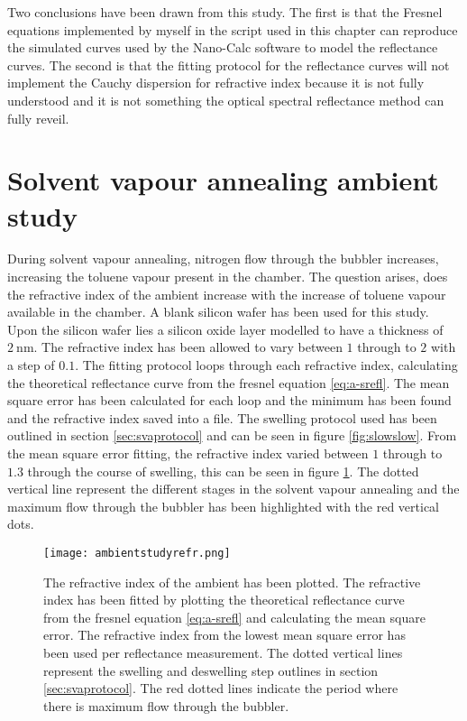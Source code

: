 \documentclass[MasterThesisMain.tex]{subfiles}
\begin{document}
Two conclusions have been drawn from this study. The first is that the Fresnel equations implemented by myself in the script used in this chapter can reproduce the simulated curves used by the Nano-Calc software to model the reflectance curves. The second is that the fitting protocol for the reflectance curves will not implement the Cauchy dispersion for refractive index because it is not fully understood and it is not something the optical spectral reflectance method can fully reveil.    
	
\section{Solvent vapour annealing ambient study}
During solvent vapour annealing, nitrogen flow through the bubbler increases, increasing the toluene vapour present in the chamber. The question arises, does the refractive index of the ambient increase with the increase of toluene vapour available in the chamber. A blank silicon wafer has been used for this study. Upon the silicon wafer lies a silicon oxide layer modelled to have a thickness of $\SI{2}{\nano\meter}$. The refractive index has been allowed to vary between $1$ through to $2$ with a step of $0.1$. The fitting protocol loops through each refractive index, calculating the theoretical reflectance curve from the fresnel equation \ref{eq:a-srefl}. The mean square error has been calculated for each loop and the minimum has been found and the refractive index saved into a file. The swelling protocol used has been outlined in section \ref{sec:svaprotocol} and can be seen in figure \ref{fig:slowslow}. From the mean square error fitting, the refractive index varied between $1$ through to $1.3$ through the course of swelling, this can be seen in figure \ref{fig:ambientrefr}. The dotted vertical line represent the different stages in the solvent vapour annealing and the maximum flow through the bubbler has been highlighted with the red vertical dots.

\begin{figure}
\centering
\texttt{[image: ambientstudyrefr.png]}
\caption{The refractive index of the ambient has been plotted. The refractive index has been fitted by plotting the theoretical reflectance curve from the fresnel equation \ref{eq:a-srefl} and calculating the mean square error. The refractive index from the lowest mean square error has been used per reflectance measurement. The dotted vertical lines represent the swelling and deswelling step outlines in section \ref{sec:svaprotocol}. The red dotted lines indicate the period where there is maximum flow through the bubbler.}
\label{fig:ambientrefr}
\end{figure}
\end{document}
